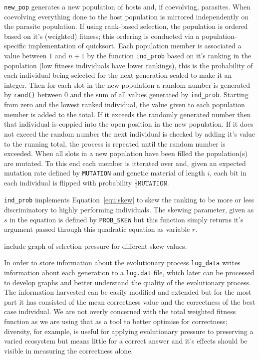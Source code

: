 \texttt{new\_pop} generates a new population of hosts and, if coevolving, parasites.
When coevolving everything done to the host population is mirrored independently
on the parasite population. If using rank-based selection, the population is ordered
based on it's (weighted) fitness; this ordering is conducted via a
population-specific implementation of quicksort. Each population member is associated
a value between $1$ and $n+1$ by the function \texttt{ind\_prob} based on it's ranking
in the population (low fitness individuals have lower rankings), this is the
probability of each individual being selected for the next generation scaled to make
it an integer. Then for each slot in the new population a
random number is generated by \texttt{rand()} between 0 and the sum of all values
generated by \texttt{ind\_prob}.
Starting from zero and the lowest ranked individual, the value given to each population
member is added to the total. If it exceeds the randomly generated number then that
individual is coppied into the open position in the new population. If it does not exceed
the random number the next individual is checked by adding it's value to the running total,
the process is repeated until the random number is exceeded. When all slots in a new
population have been filled the population(s) are mutated. To this end each member is
itterated over and, given an expected mutation rate defined by \texttt{MUTATION} and
genetic material of length $i$, each bit in each individual is flipped with probability
$\frac{1}{i}\texttt{MUTATION}$.

\texttt{ind\_prob} implements Equation~\ref{equ:skew} to skew the ranking to
be more or less discriminatory to highly performing individuals. The skewing
parameter, given as $s$ in the equation is defined by \texttt{PROB\_SKEW} but
this function simply returns it's argument passed through this quadratic equation as
variable $r$.

\todo include graph of selection pressure for different skew values.

In order to store information about the evolutionary process \texttt{log\_data}
writes information about each generation to a \texttt{log.dat} file, which later
can be processed to develop graphs and better understand the quality of the
evolutionary process. The information harvested can be easily modified and
extended but for the most part it has consisted of the mean correctness value
and the correctness of the best case individual.
We are not overly concerned with the total weighted fitness function as we
are using that as a tool to better optimise for correctness; diversity, for
example, is useful for applying evolutionary pressure to preserving a varied
ecosystem but means little for a correct answer and it's effects should be
visible in measuring the correctness alone.

